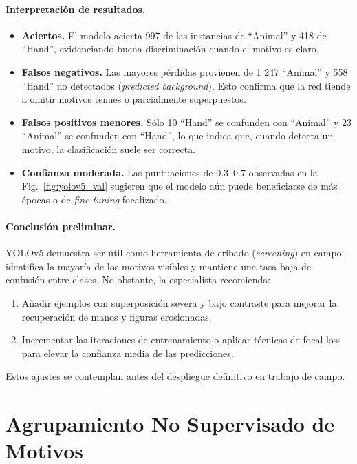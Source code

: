 \paragraph{Interpretación de resultados.}

\begin{itemize}
  \item \textbf{Aciertos.}
        El modelo acierta 997 de las instancias de “Animal” y 418 de “Hand”, evidenciando buena discriminación cuando el motivo es claro.
  \item \textbf{Falsos negativos.}
        Las mayores pérdidas provienen de 1 247 “Animal” y 558 “Hand” no detectados (\emph{predicted background}).
        Esto confirma que la red tiende a omitir motivos tenues o parcialmente superpuestos.
  \item \textbf{Falsos positivos menores.}
        Sólo 10 “Hand” se confunden con “Animal” y 23 “Animal” se confunden con “Hand”, lo que indica que, cuando detecta un motivo, la clasificación suele ser correcta.
  \item \textbf{Confianza moderada.}
        Las puntuaciones de 0.3–0.7 observadas en la Fig.~\ref{fig:yolov5_val} sugieren que el modelo aún puede beneficiarse de más épocas o de \emph{fine-tuning} focalizado.
\end{itemize}

\paragraph{Conclusión preliminar.}
YOLOv5 demuestra ser útil como herramienta de cribado (\emph{screening}) en campo: identifica la mayoría de los motivos visibles y mantiene una tasa baja de confusión entre clases.
No obstante, la especialista recomienda:

\begin{enumerate}
  \item Añadir ejemplos con superposición severa y bajo contraste para mejorar la recuperación de manos y figuras erosionadas.
  \item Incrementar las iteraciones de entrenamiento o aplicar técnicas de focal loss para elevar la confianza media de las predicciones.
\end{enumerate}
Estos ajustes se contemplan antes del despliegue definitivo en trabajo de campo.

\section{Agrupamiento No Supervisado de Motivos}

